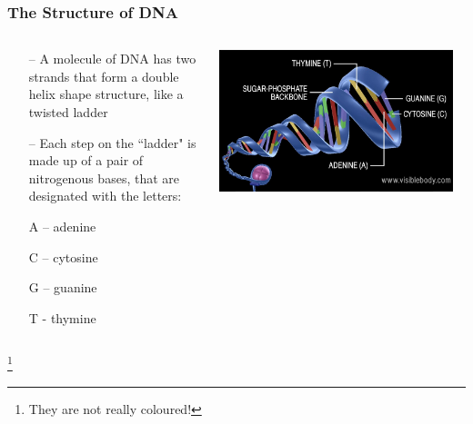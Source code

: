 \documentclass{beamer}
\newcommand\blfootnote[1]{%
	\begingroup
	\renewcommand\thefootnote{}\footnote{#1}%
	\addtocounter{footnote}{-1}%
	\endgroup
}
\begin{document}
	\begin{frame}
		\frametitle{The Structure of DNA}
		\begin{columns}
			\begin{column}{0.44\textwidth}
				
				
\begin{itemize}

\small
	\item[--] A molecule of DNA has two strands that form a double helix shape structure, like a twisted ladder
		\item[--] Each step on the ``ladder" is made up of a pair of nitrogenous bases, that are designated with the letters:
		\item[] A – adenine
		\item[] C – cytosine
		\item[] G – guanine
		\item[] T - thymine
	
		
	\end{itemize}		
\end{column}
\begin{column}{0.75\textwidth}
\centering \includegraphics[keepaspectratio, width  =0.95\textwidth]{img/DNA_cartoon}  

\end{column}
\end{columns}
\blfootnote{They are not really coloured!}
\end{frame}
	
\end{document}
